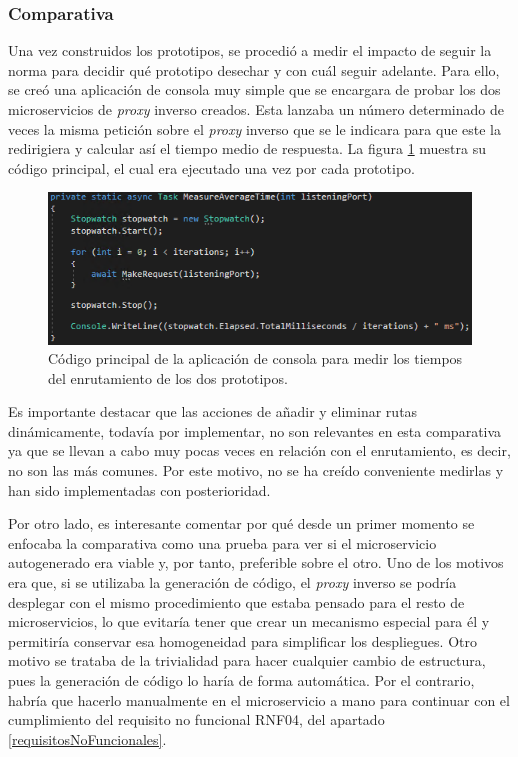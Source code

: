 \documentclass[11pt,spanish,listoffigures]{tfgetsinf}
\begin{document}
			\subsubsection{Comparativa}

Una vez construidos los prototipos, se procedió a medir el impacto de seguir la norma para decidir qué prototipo desechar y con cuál seguir adelante. Para ello, se creó una aplicación de consola muy simple que se encargara de probar los dos microservicios de \emph{proxy} inverso creados. Esta lanzaba un número determinado de veces la misma petición sobre el \emph{proxy} inverso que se le indicara para que este la redirigiera y calcular así el tiempo medio de respuesta. La figura \ref{medidorTiempos} muestra su código principal, el cual era ejecutado una vez por cada prototipo.

\begin{figure}[ht]
\centering
\includegraphics[scale=0.9]{imagenes/medidorTiempos}
\caption{Código principal de la aplicación de consola para medir los tiempos del enrutamiento de los dos prototipos.}
	\label{medidorTiempos}
\end{figure}

Es importante destacar que las acciones de añadir y eliminar rutas dinámicamente, todavía por implementar, no son relevantes en esta comparativa ya que se llevan a cabo muy pocas veces en relación con el enrutamiento, es decir, no son las más comunes. Por este motivo, no se ha creído conveniente medirlas y han sido implementadas con posterioridad.

Por otro lado, es interesante comentar por qué desde un primer momento se enfocaba la comparativa como una prueba para ver si el microservicio autogenerado era viable y, por tanto, preferible sobre el otro. Uno de los motivos era que, si se utilizaba la generación de código, el \emph{proxy} inverso se podría desplegar con el mismo procedimiento que estaba pensado para el resto de microservicios, lo que evitaría tener que crear un mecanismo especial para él y permitiría conservar esa homogeneidad para simplificar los despliegues. Otro motivo se trataba de la trivialidad para hacer cualquier cambio de estructura, pues la generación de código lo haría de forma automática. Por el contrario, habría que hacerlo manualmente en el microservicio a mano para continuar con el cumplimiento del requisito no funcional RNF04, del apartado \ref{requisitosNoFuncionales}.
\end{document}
